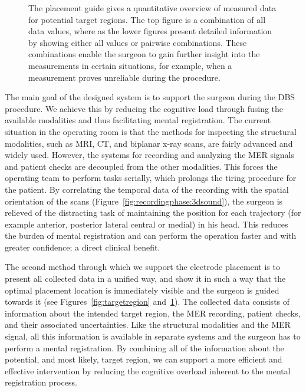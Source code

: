 \documentclass{egpubl}
\begin{document}
\begin{figure}[t]
  \centering
  \caption{The placement guide gives a quantitative overview of measured data for potential target regions. The top figure is a combination of all data values, where as the lower figures present detailed information by showing either all values or pairwise combinations. These combinations enable the surgeon to gain further insight into the measurements in certain situations, for example, when a measurement proves unreliable during the procedure.}
  \label{fig:placementguide}
\end{figure}

The main goal of the designed system is to support the surgeon during the DBS procedure. We achieve this by reducing the cognitive load through fusing the available modalities and thus facilitating mental registration. The current situation in the operating room is that the methods for inspecting the structural modalities, such as MRI, CT, and biplanar x-ray scans, are fairly advanced and widely used. However, the systems for recording and analyzing the MER signals and patient checks are decoupled from the other modalities. This forces the operating team to perform tasks serially, which prolongs the tiring procedure for the patient. By correlating the temporal data of the recording with the spatial orientation of the scans (Figure~\ref{fig:recordingphase:3dsound}), the surgeon is relieved of the distracting task of maintaining the position for each trajectory (for example anterior, posterior lateral central or medial) in his head. This reduces the burden of mental registration and can perform the operation faster and with greater confidence; a direct clinical benefit.

The second method through which we support the electrode placement is to present all collected data in a unified way, and show it in such a way that the optimal placement location is immediately visible and the surgeon is guided towards it (see Figures~\ref{fig:targetregion} and~\ref{fig:placementguide}). The collected data consists of information about the intended target region, the MER recording, patient checks, and their associated uncertainties. Like the structural modalities and the MER signal, all this information is available in separate systems and the surgeon has to perform a mental registration. By combining all of the information about the potential, and most likely, target region, we can support a more efficient and effective intervention by reducing the cognitive overload inherent to the mental registration process. 
\end{document}
